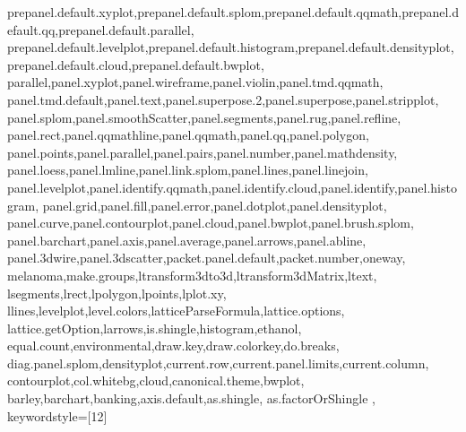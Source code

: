 \documentclass[12pt]{article}
\begin{document}
{{prepanel.default.xyplot,prepanel.default.splom,prepanel.default.qqmath,prepanel.default.qq,prepanel.default.parallel,%
prepanel.default.levelplot,prepanel.default.histogram,prepanel.default.densityplot,prepanel.default.cloud,prepanel.default.bwplot,%
parallel,panel.xyplot,panel.wireframe,panel.violin,panel.tmd.qqmath,%
panel.tmd.default,panel.text,panel.superpose.2,panel.superpose,panel.stripplot,%
panel.splom,panel.smoothScatter,panel.segments,panel.rug,panel.refline,%
panel.rect,panel.qqmathline,panel.qqmath,panel.qq,panel.polygon,%
panel.points,panel.parallel,panel.pairs,panel.number,panel.mathdensity,%
panel.loess,panel.lmline,panel.link.splom,panel.lines,panel.linejoin,%
panel.levelplot,panel.identify.qqmath,panel.identify.cloud,panel.identify,panel.histogram,%
panel.grid,panel.fill,panel.error,panel.dotplot,panel.densityplot,%
panel.curve,panel.contourplot,panel.cloud,panel.bwplot,panel.brush.splom,%
panel.barchart,panel.axis,panel.average,panel.arrows,panel.abline,%
panel.3dwire,panel.3dscatter,packet.panel.default,packet.number,oneway,%
melanoma,make.groups,ltransform3dto3d,ltransform3dMatrix,ltext,%
lsegments,lrect,lpolygon,lpoints,lplot.xy,%
llines,levelplot,level.colors,latticeParseFormula,lattice.options,%
lattice.getOption,larrows,is.shingle,histogram,ethanol,%
equal.count,environmental,draw.key,draw.colorkey,do.breaks,%
diag.panel.splom,densityplot,current.row,current.panel.limits,current.column,%
contourplot,col.whitebg,cloud,canonical.theme,bwplot,%
barley,barchart,banking,axis.default,as.shingle,%
as.factorOrShingle%
},%
keywordstyle={[12]{\bf\color{RRecomdcolor}}}%
%
}%
\end{document}
